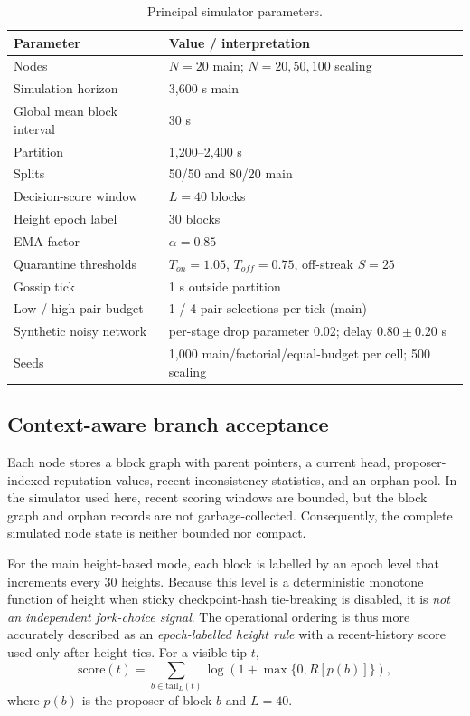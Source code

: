 \documentclass[11pt]{article}
\begin{document}
\begin{table}[H]
\centering
\caption{Principal simulator parameters.}
\label{tab:parameters}
\small
\begin{tabular}{ll}
\toprule
Parameter & Value / interpretation\\
\midrule
Nodes & $N=20$ main; $N=20,50,100$ scaling\\
Simulation horizon & 3,600 s main\\
Global mean block interval & 30 s\\
Partition & 1,200--2,400 s\\
Splits & 50/50 and 80/20 main\\
Decision-score window & $L=40$ blocks\\
Height epoch label & 30 blocks\\
EMA factor & $\alpha=0.85$\\
Quarantine thresholds & $T_{on}=1.05$, $T_{off}=0.75$, off-streak $S=25$\\
Gossip tick & 1 s outside partition\\
Low / high pair budget & 1 / 4 pair selections per tick (main)\\
Synthetic noisy network & per-stage drop parameter 0.02; delay $0.80\pm0.20$ s\\
Seeds & 1,000 main/factorial/equal-budget per cell; 500 scaling\\
\bottomrule
\end{tabular}
\end{table}

\subsection{Context-aware branch acceptance}
Each node stores a block graph with parent pointers, a current head, proposer-indexed reputation values, recent inconsistency statistics, and an orphan pool. In the simulator used here, recent scoring windows are bounded, but the block graph and orphan records are not garbage-collected. Consequently, the complete simulated node state is neither bounded nor compact.

For the main height-based mode, each block is labelled by an epoch level that increments every 30 heights. Because this level is a deterministic monotone function of height when sticky checkpoint-hash tie-breaking is disabled, it is \emph{not an independent fork-choice signal}. The operational ordering is thus more accurately described as an \emph{epoch-labelled height rule} with a recent-history score used only after height ties. For a visible tip $t$,
\[
\mathrm{score}(t)=\sum_{b\in \mathrm{tail}_L(t)}\log\left(1+\max\{0,R[p(b)]\}\right),
\]
where $p(b)$ is the proposer of block $b$ and $L=40$.
\end{document}
